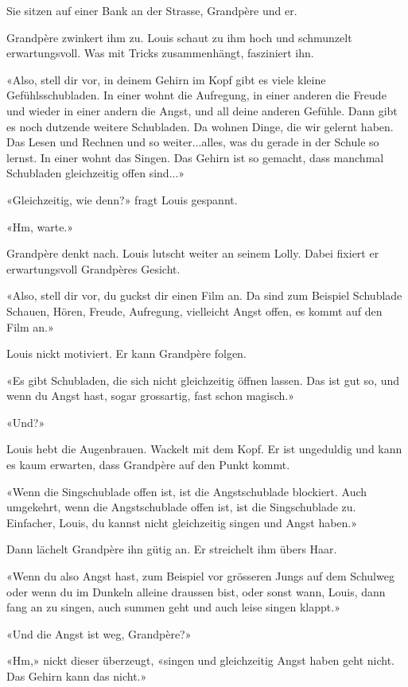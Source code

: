 Sie sitzen auf einer Bank an der Strasse, Grandpère und er.

Grandpère zwinkert ihm zu. Louis schaut zu ihm hoch und schmunzelt
erwartungsvoll. Was mit Tricks zusammenhängt, fasziniert ihn.

«Also, stell dir vor, in deinem Gehirn im Kopf gibt es viele kleine
Gefühlsschubladen. In einer wohnt die Aufregung, in einer anderen die
Freude und wieder in einer andern die Angst, und all deine anderen
Gefühle. Dann gibt es noch dutzende weitere Schubladen. Da wohnen Dinge,
die wir gelernt haben. Das Lesen und Rechnen und so weiter...alles, was
du gerade in der Schule so lernst. In einer wohnt das Singen. Das Gehirn
ist so gemacht, dass manchmal Schubladen gleichzeitig offen sind...»

«Gleichzeitig, wie denn?» fragt Louis gespannt.

«Hm, warte.»

Grandpère denkt nach. Louis lutscht weiter an seinem Lolly. Dabei
fixiert er erwartungsvoll Grandpères Gesicht.

«Also, stell dir vor, du guckst dir einen Film an. Da sind zum Beispiel
Schublade Schauen, Hören, Freude, Aufregung, vielleicht Angst offen, es
kommt auf den Film an.»

Louis nickt motiviert. Er kann Grandpère folgen.

«Es gibt Schubladen, die sich nicht gleichzeitig öffnen lassen. Das ist
gut so, und wenn du Angst hast, sogar grossartig, fast schon magisch.»

«Und?»

Louis hebt die Augenbrauen. Wackelt mit dem Kopf. Er ist ungeduldig und
kann es kaum erwarten, dass Grandpère auf den Punkt kommt.

«Wenn die Singschublade offen ist, ist die Angstschublade blockiert.
Auch umgekehrt, wenn die Angstschublade offen ist, ist die Singschublade
zu. Einfacher, Louis, du kannst nicht gleichzeitig singen und Angst
haben.»

Dann lächelt Grandpère ihn gütig an. Er streichelt ihm übers Haar.

«Wenn du also Angst hast, zum Beispiel vor grösseren Jungs auf dem
Schulweg oder wenn du im Dunkeln alleine draussen bist, oder sonst wann,
Louis, dann fang an zu singen, auch summen geht und auch leise singen
klappt.»

«Und die Angst ist weg, Grandpère?»

«Hm,» nickt dieser überzeugt, «singen und gleichzeitig Angst haben geht
nicht. Das Gehirn kann das nicht.»

